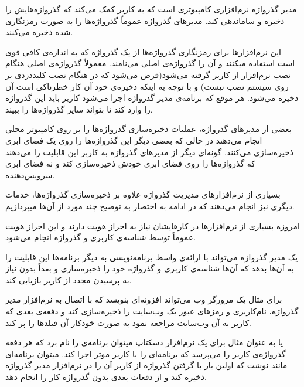 
مدیر گذرواژه نرم‌افزاری کامپیوتری است که به کاربر کمک می‌کند که گذرواژه‌هایش را ذخیره و ساماندهی کند. مدیر‌های گذرواژه عموماً گذرواژه‌ها را به صورت رمزنگاری شده ذخیره می‌کنند. 

این نرم‌افزارها برای رمزنگاری گذرواژه‌ها از یک گذرواژه‌ که به اندازه‌ی کافی قوی است استفاده میکنند و آن را گذرواژه‌ی اصلی می‌نامند. معمولاً گذرواژه‌ی اصلی هنگام نصب نرم‌افزار از کاربر گرفته می‌شود(فرض می‌شود که در هنگام نصب کلیددزدی بر روی سیستم نصب نیست) و با توجه به اینکه ذخیره‌ی خود آن کار خطرناکی است  آن ذخیره می‌شود. هر موقع که برنامه‌ی مدیر گذرواژه اجرا می‌شود کاربر باید این گذرواژه را وارد کند تا بتواند سایر گذرواژه‌ها را ببیند.

بعضی از مدیر‌های گذرواژه، عملیات ذخیره‌سازی گذرواژه‌ها را بر روی کامپیوتر محلی انجام می‌دهند در حالی که بعضی دیگر این گذرواژه‌ها را روی یک فضای ابری ذخیره‌سازی می‌کنند. گونه‌ای دیگر از مدیر‌های گذرواژه  به کاربر این قابلیت را می‌دهند که گذرواژه‌ها را روی فضای ابری خودش ذخیره‌سازی کند و نه فضای ابری سرویس‌دهنده.

بسیاری از نرم‌افزار‌های مدیریت گذرواژه علاوه بر ذخیره‌سازی گذرواژه‌ها، خدمات دیگری نیز انجام می‌دهند که در ادامه به اختصار به توضیح چند مورد از آن‌ها میپردازیم.


امروزه بسیاری از نرم‌افزارها در کارهایشان نیاز به احراز هویت دارند و این احراز هویت عموماً توسط شناسه‌ی کاربری و گذرواژه انجام می‌شود. 

یک مدیر گذرواژه می‌تواند با ارائه‌ی واسط برنامه‌نویسی به دیگر برنامه‌ها این قابلیت را به آن‌ها بدهد که آن‌ها شناسه‌ی کاربری و گذرواژه خود را ذخیره‌سازی و بعداً بدون نیاز به پرسیدن مجدد از کاربر بازیابی کند.

برای مثال یک مرورگر وب می‌تواند افزونه‌ای بنویسد که با اتصال به نرم‌افزار مدیر گذرواژه، نام‌کاربری و رمز‌های عبور یک وب‌سایت را ذخیره‌سازی کند و دفعه‌ی بعدی که کاربر به آن وب‌سایت مراجعه نمود به صورت خودکار آن فیلد‌ها را پر کند. 

یا به عنوان مثال برای یک نرم‌افزار دسکتاپ میتوان برنامه‌ی  را نام برد که هر دفعه گذرواژه‌ی کاربر را می‌پرسد که برنامه‌ای را با کاربر موثر  اجرا کند. میتوان برنامه‌ای مانند  نوشت که اولین بار با گرفتن گذرواژه از کاربر آن را در نرم‌افزار مدیر گذرواژه ذخیره کند و از دفعات بعدی بدون گذرواژه کار را انجام دهد.



